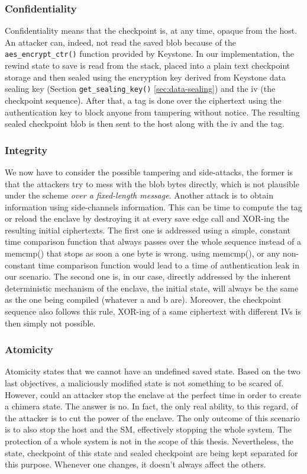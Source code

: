 \documentclass[11pt,a4paper]{report}
\begin{document}
\subsubsection{Confidentiality}
Confidentiality means that the checkpoint is, at any time, opaque from the host. 
An attacker can, indeed, not read the saved blob because of the \verb|aes_encrypt_ctr()| function provided by Keystone.   
In our implementation, the rewind state to save is read from the stack, placed into a plain text checkpoint storage and then sealed using the encryption key derived from Keystone data sealing key (Section \verb|get_sealing_key()| \ref{sec:data-sealing}) and the iv (the checkpoint sequence).
After that, a tag is done over the ciphertext using the authentication key to block anyone from tampering without notice.
The resulting sealed checkpoint blob is then sent to the host along with the iv and the tag.


\subsubsection{Integrity}
We now have to consider the possible tampering and side-attacks, the former is that the attackers try to mess with the blob bytes directly, which is not plausible under the scheme \textit{over a fixed-length message}. 
Another attack is to obtain information using side-channels information. This can be time to compute the tag or reload the enclave by destroying it at every save edge call and XOR-ing the resulting initial ciphertexts.
The first one is addressed using a simple, constant time comparison function that always passes over the whole sequence instead of a memcmp() that stops as soon a one byte is wrong.
using memcmp(), or any non-constant time comparison function would lead to a time of authentication leak in our scenario.
The second one is, in our case, directly addressed by the inherent deterministic mechanism of the enclave, the initial state, will always be the same as the one being compiled (whatever a and b are).
Moreover, the checkpoint sequence also follows this rule, XOR-ing of a same ciphertext with different IVs is then simply not possible. 

\subsubsection{Atomicity}
Atomicity states that we cannot have an undefined saved state. Based on the two last objectives, a maliciously modified state is not something to be scared of.
However, could an attacker stop the enclave at the perfect time in order to create a chimera state.
The answer is no. In fact, the only real ability, to this regard, of the attacker is to cut the power of the enclave. 
The only outcome of this scenario is to also stop the host and the SM, effectively stopping the whole system.
The protection of a whole system is not in the scope of this thesis.
Nevertheless, the state, checkpoint of this state and sealed checkpoint are being kept separated for this purpose. 
Whenever one changes, it doesn't always affect the others.
\end{document}

